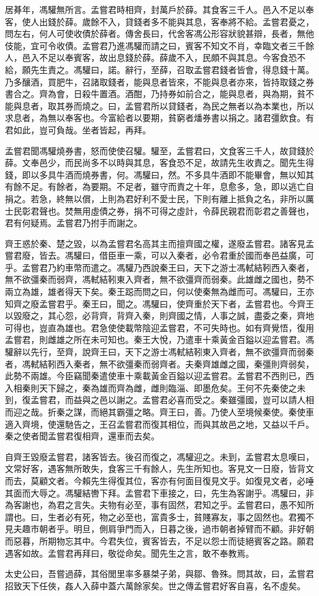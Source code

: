 居朞年，馮驩無所言。孟嘗君時相齊，封萬戶於薛。其食客三千人。邑入不足以奉客，使人出錢於薛。歲餘不入，貸錢者多不能與其息，客奉將不給。孟嘗君憂之，問左右，何人可使收債於薛者。傳舍長曰，代舍客馮公形容狀貌甚辯，長者，無他伎能，宜可令收債。孟嘗君乃進馮驩而請之曰，賓客不知文不肖，幸臨文者三千餘人，邑入不足以奉賓客，故出息錢於薛。薛歲不入，民頗不與其息。今客食恐不給，願先生責之。馮驩曰，諾。辭行，至薛，召取孟嘗君錢者皆會，得息錢十萬。乃多釀酒，買肥牛，召諸取錢者，能與息者皆來，不能與息者亦來，皆持取錢之券書合之。齊為會，日殺牛置酒。酒酣，乃持券如前合之，能與息者，與為期，貧不能與息者，取其券而燒之。曰，孟嘗君所以貸錢者，為民之無者以為本業也，所以求息者，為無以奉客也。今富給者以要期，貧窮者燔券書以捐之。諸君彊飲食。有君如此，豈可負哉。坐者皆起，再拜。

孟嘗君聞馮驩燒券書，怒而使使召驩。驩至，孟嘗君曰，文食客三千人，故貸錢於薛。文奉邑少，而民尚多不以時與其息，客食恐不足，故請先生收責之。聞先生得錢，即以多具牛酒而燒券書，何。馮驩曰，然。不多具牛酒即不能畢會，無以知其有餘不足。有餘者，為要期。不足者，雖守而責之十年，息愈多，急，即以逃亡自捐之。若急，終無以償，上則為君好利不愛士民，下則有離上抵負之名，非所以厲士民彰君聲也。焚無用虛債之券，捐不可得之虛計，令薛民親君而彰君之善聲也，君有何疑焉。孟嘗君乃拊手而謝之。

齊王惑於秦、楚之毀，以為孟嘗君名高其主而擅齊國之權，遂廢孟嘗君。諸客見孟嘗君廢，皆去。馮驩曰，借臣車一乘，可以入秦者，必令君重於國而奉邑益廣，可乎。孟嘗君乃約車幣而遣之。馮驩乃西說秦王曰，天下之游士馮軾結靷西入秦者，無不欲彊秦而弱齊，馮軾結靷東入齊者，無不欲彊齊而弱秦。此雄雌之國也，勢不兩立為雄，雄者得天下矣。秦王跽而問之曰，何以使秦無為雌而可。馮驩曰，王亦知齊之廢孟嘗君乎。秦王曰，聞之。馮驩曰，使齊重於天下者，孟嘗君也。今齊王以毀廢之，其心怨，必背齊，背齊入秦，則齊國之情，人事之誠，盡委之秦，齊地可得也，豈直為雄也。君急使使載幣陰迎孟嘗君，不可失時也。如有齊覺悟，復用孟嘗君，則雌雄之所在未可知也。秦王大悅，乃遣車十乘黃金百鎰以迎孟嘗君。馮驩辭以先行，至齊，說齊王曰，天下之游士馮軾結靷東入齊者，無不欲彊齊而弱秦者，馮軾結靷西入秦者，無不欲彊秦而弱齊者。夫秦齊雄雌之國，秦彊則齊弱矣，此勢不兩雄。今臣竊聞秦遣使車十乘載黃金百鎰以迎孟嘗君。孟嘗君不西則已，西入相秦則天下歸之，秦為雄而齊為雌，雌則臨淄、即墨危矣。王何不先秦使之未到，復孟嘗君，而益與之邑以謝之。孟嘗君必喜而受之。秦雖彊國，豈可以請人相而迎之哉。折秦之謀，而絕其霸彊之略。齊王曰，善。乃使人至境候秦使。秦使車適入齊境，使還馳告之，王召孟嘗君而復其相位，而與其故邑之地，又益以千戶。秦之使者聞孟嘗君復相齊，還車而去矣。

自齊王毀廢孟嘗君，諸客皆去。後召而復之，馮驩迎之。未到，孟嘗君太息嘆曰，文常好客，遇客無所敢失，食客三千有餘人，先生所知也。客見文一日廢，皆背文而去，莫顧文者。今賴先生得復其位，客亦有何面目復見文乎。如復見文者，必唾其面而大辱之。馮驩結轡下拜。孟嘗君下車接之，曰，先生為客謝乎。馮驩曰，非為客謝也，為君之言失。夫物有必至，事有固然，君知之乎。孟嘗君曰，愚不知所謂也。曰，生者必有死，物之必至也，富貴多士，貧賤寡友，事之固然也。君獨不見夫趣市朝者乎。明旦，側肩爭門而入，日暮之後，過市朝者掉臂而不顧。非好朝而惡暮，所期物忘其中。今君失位，賓客皆去，不足以怨士而徒絕賓客之路。願君遇客如故。孟嘗君再拜曰，敬從命矣。聞先生之言，敢不奉教焉。

太史公曰，吾嘗過薛，其俗閭里率多暴桀子弟，與鄒、魯殊。問其故，曰，孟嘗君招致天下任俠，姦人入薛中蓋六萬餘家矣。世之傳孟嘗君好客自喜，名不虛矣。